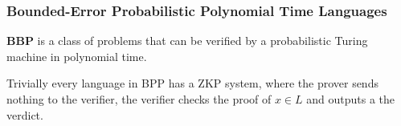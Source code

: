 \subsubsection{Bounded-Error Probabilistic Polynomial Time Languages}

\textbf{BBP} is a class of problems that can be verified by a probabilistic Turing machine in polynomial time.

Trivially every language in BPP has a ZKP system, where the prover sends nothing to the verifier, the verifier checks the proof of $x \in L$ and outputs a the verdict. %

